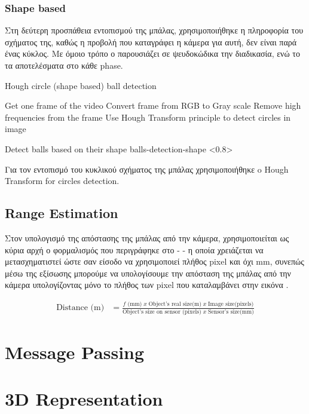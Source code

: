 \subsubsection{Shape based}

Στη δεύτερη προσπάθεια εντοπισμού της μπάλας, χρησιμοποιήθηκε η πληροφορία του σχήματος της, καθώς η προβολή που καταγράφει η κάμερα για αυτή, δεν είναι παρά ένας κύκλος. Με όμοιο τρόπο ο  παρουσιάζει σε ψευδοκώδικα την διαδικασία, ενώ το  τα αποτελέσματα στο κάθε phase.

\begin{algorithm}[H]
	\caption[Hough circle (shape based) ball detection]{Hough circle (shape based) ball detection}\label{alg:hough-detect}
	\begin{algorithmic}[1]
            \State Get one frame of the video
            \State Convert frame from RGB to Gray scale
            \State Remove high frequencies from the frame
            \State Use Hough Transform principle to detect circles in image 
	\end{algorithmic}
\end{algorithm}

%
{Detect balls based on their shape}%
{balls-detection-shape}%
<0.8>

Για τον εντοπισμό του κυκλικού σχήματος της μπάλας χρησιμοποιήθηκε o Hough Transform for circles detection.



\subsection{Range Estimation}
Στον υπολογισμό της απόστασης της μπάλας από την κάμερα, χρησιμοποιείται ως κύρια αρχή ο φορμαλισμός που περιγράφηκε στο  -  - η οποία χρειάζεται να μετασχηματιστεί ώστε σαν είσοδο να χρησιμοποιεί πλήθος pixel και όχι mm, συνεπώς μέσω της εξίσωσης  μπορούμε να υπολογίσουμε την απόσταση της μπάλας από την κάμερα υπολογίζοντας μόνο το πλήθος των pixel που καταλαμβάνει στην εικόνα \cite{calculate-distance-stackexchange} \cite{calculate-distance-or-size-of-an-objectin-a-photo-image}.

\begin{align}
	\textrm{Distance (m)} &= \frac{\textrm{$f$ (mm)}\; x\;\textrm{Object's real size(m)}\; x\; \textrm{Image size(pixels)}}{\textrm{Object's size on sensor (pixels)}\; x\; \textrm{Sensor's size(mm)}} \label{eq:distance-from-object-pixels}
\end{align}

\section{Message Passing}

\section{3D Representation}


